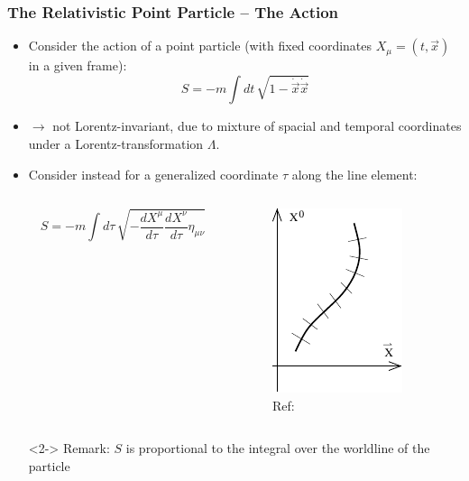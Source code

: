 \documentclass[aspectratio=169]{beamer}
\begin{document}
	\begin{frame}
		\frametitle{The Relativistic Point Particle -- The Action}
		\begin{itemize}[]
			\item<1-> Consider the action of a point particle (with fixed coordinates $X_\mu = (t,\vec{x})$ in a given frame):
			\begin{equation*}
				S = -m \int dt \, \sqrt{1-\dot{\vec{x}}\dot{\vec{x}}}
			\end{equation*}
			\item<1->[] $\rightarrow$ not Lorentz-invariant, due to mixture of spacial and temporal coordinates under a Lorentz-transformation $\Lambda$.
			\item[]
			\item<2-> Consider instead for a generalized coordinate $\tau$ along the line element:
			\begin{columns}
				\begin{column}{0.8\textwidth}
					\begin{equation*}
						S = -m \int d\tau \, \sqrt{-\frac{dX^\mu}{d\tau} \frac{dX^\nu}{d\tau}\eta_{\mu\nu}}
					\end{equation*}
				\end{column}
				\begin{column}{0.2\textwidth}
					\begin{figure}
						\includegraphics[width=0.5\linewidth]{res/TongP17_graph}
						\caption*{Ref: \cite{tong_lectures_2012}}
					\end{figure}
				\end{column}
			\end{columns}
			\item[]<2-> Remark: $S$ is proportional to the integral over the worldline of the particle
		\end{itemize}
	\end{frame}
\end{document}
